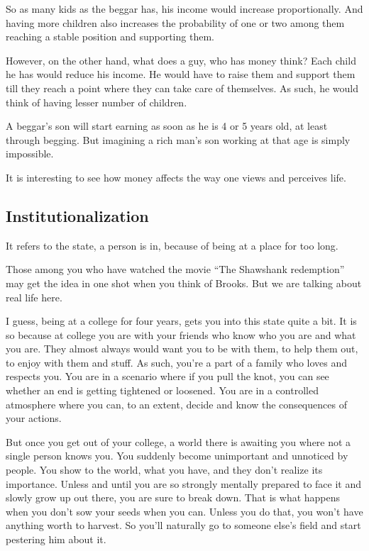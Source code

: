\documentclass[twoside,11pt,titlepage]{article}
\begin{document}
So as many kids as the beggar has, his income would increase proportionally. And having more children also increases the probability of one or two among them reaching a stable position and supporting them.

However, on the other hand, what does a guy, who has money think? Each child he has would reduce his income. He would have to raise them and support them till they reach a point where they can take care of themselves. As such, he would think of having lesser number of children.

A beggar's son will start earning as soon as he is 4 or 5 years old, at least through begging. But imagining a rich man's son working at that age is simply impossible.

It is interesting to see how money affects the way one views and perceives life.

\newpage
\begin{center}
  \section{Institutionalization}
\end{center}
\bigskip
\bigskip
\bigskip

It refers to the state, a person is in, because of being at a place for too long.

Those among you who have watched the movie ``The Shawshank redemption'' may get the idea in one shot when you think of Brooks. But we are talking about real life here.

I guess, being at a college for four years, gets you into this state quite a bit. It is so because at college you are with your friends who know who you are and what you are. They almost always would want you to be with them, to help them out, to enjoy with them and stuff. As such, you're a part of a family who loves and respects you. You are in a scenario where if you pull the knot, you can see whether an end is getting tightened or loosened. You are in a controlled atmosphere where you can, to an extent, decide and know the consequences of your actions.

But once you get out of your college, a world there is awaiting you where not a single person knows you. You suddenly become unimportant and unnoticed by people. You show to the world, what you have, and they don't realize its importance. Unless and until you are so strongly mentally prepared to face it and slowly grow up out there, you are sure to break down. That is what happens when you don't sow your seeds when you can. Unless you do that, you won't have anything worth to harvest. So you'll naturally go to someone else's field and start pestering him about it.
\end{document}
